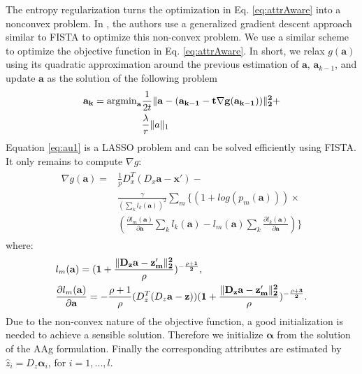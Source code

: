 \documentclass[letterpaper]{article} %
\def\x{\mathbf{x}}
\def\a{\mathbf{a}}
\def\balpha{\boldsymbol{\alpha}}
\begin{document}
The entropy regularization turns the optimization in Eq. \eqref{eq:attrAware} into a nonconvex problem. In \cite{huang2016sparse}, the authors use a generalized gradient descent approach similar to FISTA to optimize this non-convex problem. We use a similar scheme to optimize the objective function in Eq. \eqref{eq:attrAware}. In short, we relax $g(\a)$  using its quadratic approximation   around the previous estimation of $\a$, $\a_{k-1}$, and update $\a$ as the solution of the following problem %
\begin{eqnarray}
\begin{split}
\bf{a}_k = \operatorname{argmin}_{\bf{a}}&
\frac{1}{2t}\|\bf{a}-(\bf{a}_{k-1}-t\nabla g(\bf{a}_{k-1}))\|_2^2+\\& \frac{\lambda}{r}\|a\|_1
\end{split}
\label{eq:au1}
\end{eqnarray}
Equation \eqref{eq:au1} is a LASSO problem and can be solved efficiently using FISTA. It only remains to compute  $\nabla g$: 
{\small\begin{eqnarray}
\begin{split}
\nabla g(\a) = &  \frac{1}{p}D_x^T(D_x\a-\x')-\\& \frac{\gamma}{(\sum_k l_k(\a))^2} \sum_m\{(1+log(p_m(\a)))\times \\&(\frac{\partial l_m(\a)}{\partial \a}\sum_k l_k(\a)-l_m(\a)\sum_k \frac{\partial l_k(\a)}{\partial \a}) \}
\end{split}
\label{eq:au2}
\end{eqnarray} }
where:
{\small
\begin{equation*}
\begin{split}
&l_m(\bf{a})=(1+\frac{\| D_z{\bf a}-\bf{z}'_m\|_2^2}{\rho})^{-\frac{\rho+1}{2}},\\&\frac{\partial l_m({\bf a})}{\partial{ \bf a}}=-\frac{\rho+1}{\rho}(D_z^T(D_z{\bf a}-\bf{z}))   (1+\frac{\|D_z{\bf a}-\bf{z}'_m\|_2^2}{\rho})^{-\frac{\rho+3}{2}}.
\end{split}
\label{eq:au4}
\end{equation*}}
Due to the non-convex nature of the objective function, a good initialization is needed to achieve a sensible solution. Therefore we initialize $\balpha$ from the solution of the AAg formulation. Finally the corresponding attributes are estimated by $\hat{z}_i=D_z\balpha_i$, for $i=1,...,l$.



 
 
\end{document}
